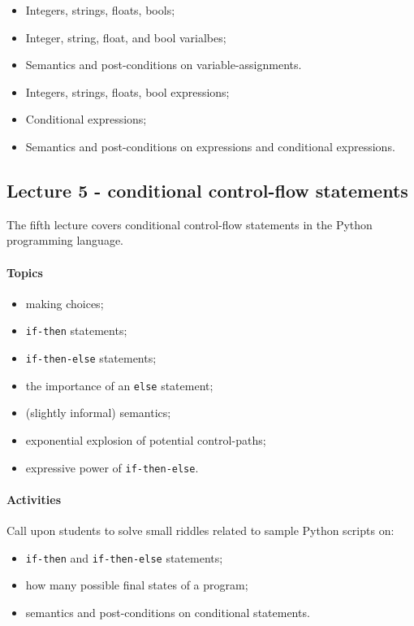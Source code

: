 					\begin{itemize}
						\item Integers, strings, floats, bools;
						\item Integer, string, float, and bool varialbes;
						\item Semantics and post-conditions on variable-assignments.
						\item Integers, strings, floats, bool expressions;
						\item Conditional expressions;
						\item Semantics and post-conditions on expressions and conditional expressions.
					\end{itemize}

			\subsection{Lecture 5 - conditional control-flow statements}
				The fifth lecture covers conditional control-flow statements in the Python programming language.

				\paragraph*{Topics}
					\begin{itemize}
						\item making choices;
						\item \texttt{if-then} statements;
						\item \texttt{if-then-else} statements;
						\item the importance of an \texttt{else} statement;
						\item (slightly informal) semantics;
						\item exponential explosion of potential control-paths;
						\item expressive power of \texttt{if-then-else}.
					\end{itemize}

				\paragraph*{Activities}
					Call upon students to solve small riddles related to sample Python scripts on:

					\begin{itemize}
						\item \texttt{if-then} and \texttt{if-then-else} statements;
						\item how many possible final states of a program;
						\item semantics and post-conditions on conditional statements.
					\end{itemize}


